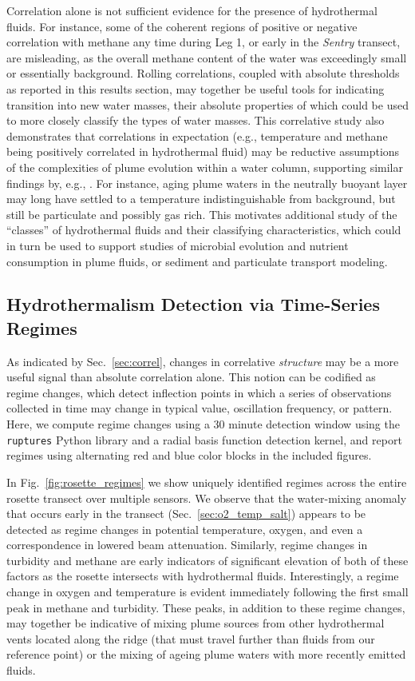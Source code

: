 Correlation alone is not sufficient evidence for the presence of hydrothermal fluids. For instance, some of the coherent regions of positive or negative correlation with methane any time during Leg 1, or early in the \emph{Sentry} transect, are misleading, as the overall methane content of the water was exceedingly small or essentially background. Rolling correlations, coupled with absolute thresholds as reported in this results section, may together be useful tools for indicating transition into new water masses, their absolute properties of which could be used to more closely classify the types of water masses. This correlative study also demonstrates that correlations in expectation (e.g., temperature and methane being positively correlated in hydrothermal fluid) may be reductive assumptions of the complexities of plume evolution within a water column, supporting similar findings by, e.g., \cite{cowen2002methane}. For instance, aging plume waters in the neutrally buoyant layer may long have settled to a temperature indistinguishable from background, but still be particulate and possibly gas rich. This motivates additional study of the ``classes'' of hydrothermal fluids and their classifying characteristics, which could in turn be used to support studies of microbial evolution and nutrient consumption in plume fluids, or sediment and particulate transport modeling.

\subsection{Hydrothermalism Detection via Time-Series Regimes}
As indicated by Sec.~\ref{sec:correl}, changes in correlative \emph{structure} may be a more useful signal than absolute correlation alone. This notion can be codified as regime changes, which detect inflection points in which a series of observations collected in time may change in typical value, oscillation frequency, or pattern. Here, we compute regime changes using a 30 minute detection window using the \verb|ruptures| Python library and a radial basis function detection kernel, and report regimes using alternating red and blue color blocks in the included figures.

In Fig.~\ref{fig:rosette_regimes} we show uniquely identified regimes across the entire rosette transect over multiple sensors. We observe that the water-mixing anomaly that occurs early in the transect (Sec.~\ref{sec:o2_temp_salt}) appears to be detected as regime changes in potential temperature, oxygen, and even a correspondence in lowered beam attenuation. Similarly, regime changes in turbidity and methane are early indicators of significant elevation of both of these factors as the rosette intersects with hydrothermal fluids. Interestingly, a regime change in oxygen and temperature is evident immediately following the first small peak in methane and turbidity. These peaks, in addition to these regime changes, may together be indicative of mixing plume sources from other hydrothermal vents located along the ridge (that must travel further than fluids from our reference point) or the mixing of ageing plume waters with more recently emitted fluids.

